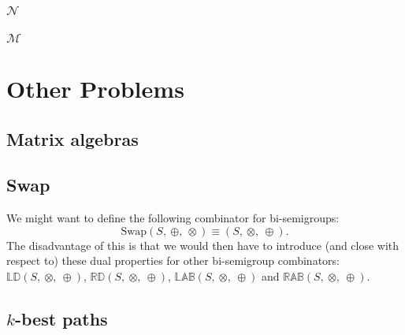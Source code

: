 \documentclass[10pt]{report}
\newcommand{\propname}[1]{{\mathbb{#1}}}
\begin{document}
\subsection{$\mathcal{N}$} 






\subsection{$\mathcal{M}$} 






\chapter{Other Problems} 

\section{Matrix algebras}

\section{Swap}

We might want to define the following combinator for bi-semigroups:
\[ 
\mathrm{Swap}(S,\ \oplus,\ \otimes)   
   \equiv 
   (S,\ \otimes,\ \oplus). 
\] 
The disadvantage of this is that we would then have to introduce 
(and close with respect to) these dual properties for other bi-semigroup combinators: $\propname{LD}(S,\ \otimes,\ \oplus)$, $\propname{RD}(S,\ \otimes,\ \oplus)$, $\propname{LAB}(S,\ \otimes,\ \oplus)$ and $\propname{RAB}(S,\ \otimes,\ \oplus)$.

\section{$k$-best paths}


\end{document}
